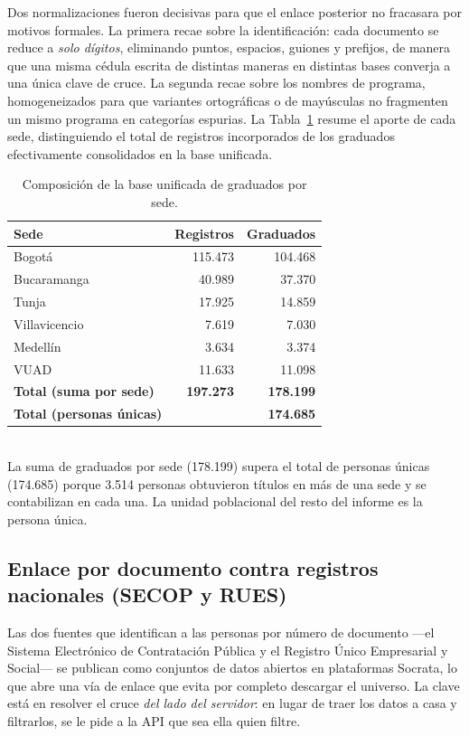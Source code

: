 Dos normalizaciones fueron decisivas para que el enlace posterior no fracasara por motivos formales. La primera recae sobre la identificación: cada documento se reduce a \emph{solo dígitos}, eliminando puntos, espacios, guiones y prefijos, de manera que una misma cédula escrita de distintas maneras en distintas bases converja a una única clave de cruce. La segunda recae sobre los nombres de programa, homogeneizados para que variantes ortográficas o de mayúsculas no fragmenten un mismo programa en categorías espurias. La Tabla~\ref{tab:base_unificada} resume el aporte de cada sede, distinguiendo el total de registros incorporados de los graduados efectivamente consolidados en la base unificada.

\begin{table}[htbp]
\centering
\caption{Composición de la base unificada de graduados por sede.}
\label{tab:base_unificada}
\begin{tabularx}{\linewidth}{Xrr}
\toprule
\rowcolor{ustaazul}
\textbf{\color{white}Sede} & \textbf{\color{white}Registros} & \textbf{\color{white}Graduados} \\
\midrule
Bogotá & 115.473 & 104.468 \\
Bucaramanga & 40.989 & 37.370 \\
Tunja & 17.925 & 14.859 \\
Villavicencio & 7.619 & 7.030 \\
Medellín & 3.634 & 3.374 \\
VUAD & 11.633 & 11.098 \\
\midrule
\textbf{Total (suma por sede)} & \textbf{197.273} & \textbf{178.199} \\
\textbf{Total (personas únicas)} & & \textbf{174.685} \\
\bottomrule
\end{tabularx}
\\[3pt]{\footnotesize\color{ustagris} La suma de graduados por sede (178.199) supera el total de personas únicas (174.685) porque 3.514 personas obtuvieron títulos en más de una sede y se contabilizan en cada una. La unidad poblacional del resto del informe es la persona única.}
\end{table}

\subsection{Enlace por documento contra registros nacionales (SECOP y RUES)}

Las dos fuentes que identifican a las personas por número de documento —el Sistema Electrónico de Contratación Pública y el Registro Único Empresarial y Social— se publican como conjuntos de datos abiertos en plataformas Socrata, lo que abre una vía de enlace que evita por completo descargar el universo. La clave está en resolver el cruce \emph{del lado del servidor}: en lugar de traer los datos a casa y filtrarlos, se le pide a la API que sea ella quien filtre.

